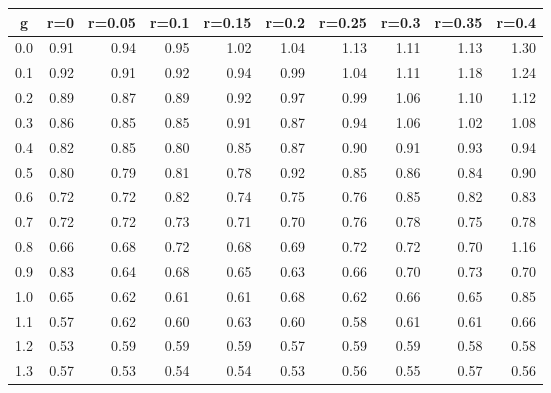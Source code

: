 %
\begin{table}[!tbp]
 \begin{center}
 \begin{tabular}{rrrrrrrrrr}\hline\hline
\multicolumn{1}{c}{g}&\multicolumn{1}{c}{r=0}&\multicolumn{1}{c}{r=0.05}&\multicolumn{1}{c}{r=0.1}&\multicolumn{1}{c}{r=0.15}&\multicolumn{1}{c}{r=0.2}&\multicolumn{1}{c}{r=0.25}&\multicolumn{1}{c}{r=0.3}&\multicolumn{1}{c}{r=0.35}&\multicolumn{1}{c}{r=0.4}\tabularnewline
\hline
0.0&0.91&0.94&0.95&1.02&1.04&1.13&1.11&1.13&1.30\tabularnewline
0.1&0.92&0.91&0.92&0.94&0.99&1.04&1.11&1.18&1.24\tabularnewline
0.2&0.89&0.87&0.89&0.92&0.97&0.99&1.06&1.10&1.12\tabularnewline
0.3&0.86&0.85&0.85&0.91&0.87&0.94&1.06&1.02&1.08\tabularnewline
0.4&0.82&0.85&0.80&0.85&0.87&0.90&0.91&0.93&0.94\tabularnewline
0.5&0.80&0.79&0.81&0.78&0.92&0.85&0.86&0.84&0.90\tabularnewline
0.6&0.72&0.72&0.82&0.74&0.75&0.76&0.85&0.82&0.83\tabularnewline
0.7&0.72&0.72&0.73&0.71&0.70&0.76&0.78&0.75&0.78\tabularnewline
0.8&0.66&0.68&0.72&0.68&0.69&0.72&0.72&0.70&1.16\tabularnewline
0.9&0.83&0.64&0.68&0.65&0.63&0.66&0.70&0.73&0.70\tabularnewline
1.0&0.65&0.62&0.61&0.61&0.68&0.62&0.66&0.65&0.85\tabularnewline
1.1&0.57&0.62&0.60&0.63&0.60&0.58&0.61&0.61&0.66\tabularnewline
1.2&0.53&0.59&0.59&0.59&0.57&0.59&0.59&0.58&0.58\tabularnewline
1.3&0.57&0.53&0.54&0.54&0.53&0.56&0.55&0.57&0.56\tabularnewline
\hline
\end{tabular}

\end{center}

\end{table}

